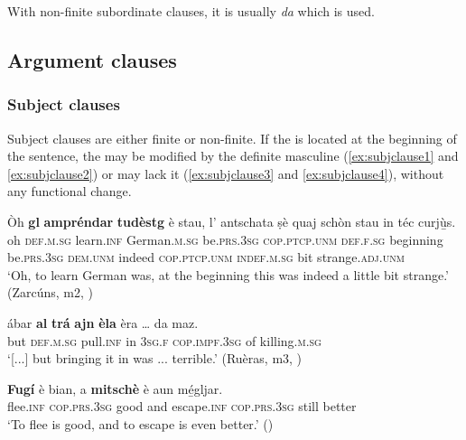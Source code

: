 With non-finite subordinate clauses, it is usually \textit{da} which is used.

\subsection{Argument clauses}\label{sec:6.2.1}

\subsubsection{Subject clauses}\label{sec:6.2.1.1}
Subject clauses are either finite or non-finite. If the  is located at the beginning of the sentence, the  may be modified by the definite masculine  (\ref{ex:subjclause1} and \ref{ex:subjclause2}) or may lack it (\ref{ex:subjclause3} and \ref{ex:subjclause4}), without any functional change.

\ea
\label{ex:subjclause1}
	\gll    Òh \textbf{gl} \textbf{ampréndar} \textbf{tudèstg} è stau, l’ antschata ṣè quaj schòn stau in téc curjù̱s.\\
oh \textsc{def.m.sg} learn.\textsc{inf} German.\textsc{m.sg} be.\textsc{prs.3sg}  \textsc{cop.ptcp.unm} \textsc{def.f.sg} beginning be.\textsc{prs.3sg} \textsc{dem.unm} indeed \textsc{cop.ptcp.unm} \textsc{indef.m.sg} bit strange.\textsc{adj.unm}\\
\glt `Oh, to learn German was, at the beginning this was indeed a little bit strange.' (Zarcúns, m2, )
\z

\ea
\label{ex:subjclause2}
\gll [...] ábar \textbf{al} \textbf{trá} \textbf{ajn} \textbf{èla} èra … da maz.   \\
{} but \textsc{def.m.sg} pull.\textsc{inf} in \textsc{3sg.f} \textsc{cop.impf.3sg} {} of killing.\textsc{m.sg}\\
\glt `[...] but bringing it in was ... terrible.' (Ruèras, m3, )
\z

\ea
\label{ex:subjclause3}
\gll \textbf{Fugí} è bian, a \textbf{mitschè} è aun mé̱gljar. \\
   flee.\textsc{inf} \textsc{cop.prs.3sg} good and escape.\textsc{inf} \textsc{cop.prs.3sg} still better  \\
\glt `To flee is good, and to escape is even better.' ()
\z

